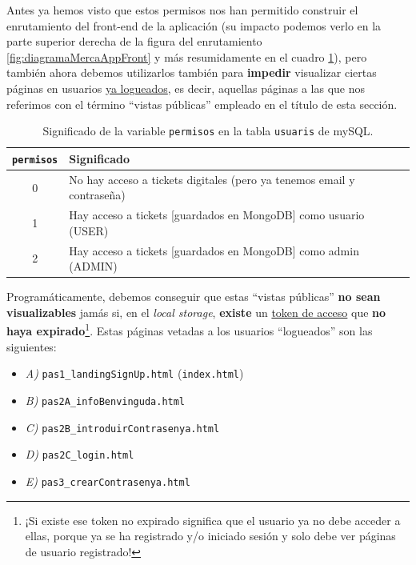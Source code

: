 \documentclass[a4paper,12pt]{report}
\begin{document}
	Antes ya hemos visto que estos permisos nos han permitido construir el enrutamiento del front-end de la aplicación (su impacto podemos verlo en la parte superior derecha de la figura del enrutamiento \ref{fig:diagramaMercaAppFront} y más resumidamente en el cuadro \ref{table:permisos}), pero también ahora debemos utilizarlos también para \textbf{impedir} visualizar ciertas páginas en usuarios \underline{ya logueados}, es decir, aquellas páginas a las que nos referimos con el término ``vistas públicas'' empleado en el título de esta sección.
	
	\begin{table}[H]
		\centering
		\caption{Significado de la variable \texttt{permisos} en la tabla \texttt{usuaris} de mySQL.}
		\begin{tabular}{|c|l|}
			\hline
			\textbf{\texttt{permisos}} & \textbf{Significado} \\
			\hline
			0 & No hay acceso a tickets digitales (pero ya tenemos email y contraseña) \\
			1 & Hay acceso a tickets [guardados en MongoDB] como usuario  (USER) \\
			2 & Hay acceso a tickets [guardados en MongoDB] como admin (ADMIN) \\
			\hline
		\end{tabular}
		\label{table:permisos}
		
	\end{table}
	
	Programáticamente, debemos conseguir que estas ``vistas públicas'' \textbf{no sean visualizables} jamás si, en el \textit{local storage}, \textbf{existe}  un \underline{token de acceso} que \textbf{no haya expirado}\footnote{¡Si existe ese token no expirado significa que el usuario ya no debe acceder a ellas, porque ya se ha registrado y/o iniciado sesión y solo debe ver páginas de usuario registrado!}. Estas páginas vetadas a los usuarios ``logueados'' son las siguientes:
	
	\vspace{0em}
	\begin{itemize}
		\setlength{\itemsep}{-.5em}
		\item \textit{A)} \texttt{pas1\_landingSignUp.html} (\texttt{index.html})
		\item \textit{B)} \texttt{pas2A\_infoBenvinguda.html}
		\item \textit{C)} \texttt{pas2B\_introduirContrasenya.html}
		\item \textit{D)} \texttt{pas2C\_login.html}
		\item \textit{E)} \texttt{pas3\_crearContrasenya.html}
	\end{itemize}
	
\end{document}
